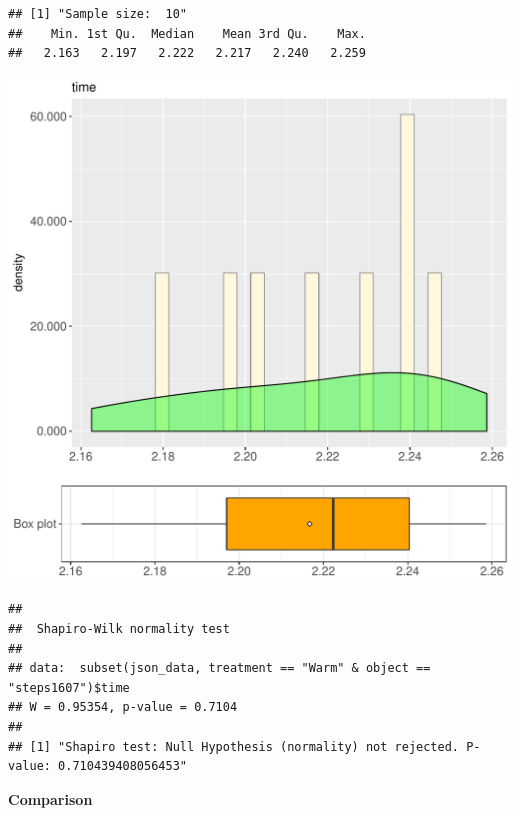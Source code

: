\documentclass{article}\usepackage[]{graphicx}\usepackage[]{color}
\makeatletter
\def\maxwidth{ %
  \ifdim\Gin@nat@width>\linewidth
    \linewidth
  \else
    \Gin@nat@width
  \fi
}
\newenvironment{kframe}{%
 \def\at@end@of@kframe{}%
 \ifinner\ifhmode%
  \def\at@end@of@kframe{\end{minipage}}%
  \begin{minipage}{\columnwidth}%
 \fi\fi%
 \def\FrameCommand##1{\hskip\@totalleftmargin \hskip-\fboxsep
 \colorbox{shadecolor}{##1}\hskip-\fboxsep
     \hskip-\linewidth \hskip-\@totalleftmargin \hskip\columnwidth}%
 \MakeFramed {\advance\hsize-\width
   \@totalleftmargin\z@ \linewidth\hsize
   \@setminipage}}%
 {\par\unskip\endMakeFramed%
 \at@end@of@kframe}
\newenvironment{knitrout}{}{} %
\makeatother
\begin{document}
\begin{knitrout}
\color{fgcolor}\begin{kframe}
\begin{verbatim}
## [1] "Sample size:  10"
##    Min. 1st Qu.  Median    Mean 3rd Qu.    Max. 
##   2.163   2.197   2.222   2.217   2.240   2.259
\end{verbatim}
\end{kframe}
\includegraphics[width=\maxwidth]{figure/RH1_Warm_steps1607-1} 
\begin{kframe}\begin{verbatim}
## 
## 	Shapiro-Wilk normality test
## 
## data:  subset(json_data, treatment == "Warm" & object == "steps1607")$time
## W = 0.95354, p-value = 0.7104
## 
## [1] "Shapiro test: Null Hypothesis (normality) not rejected. P-value: 0.710439408056453"
\end{verbatim}
\end{kframe}
\end{knitrout}
  
 \textbf{Comparison}
  
\end{document}
